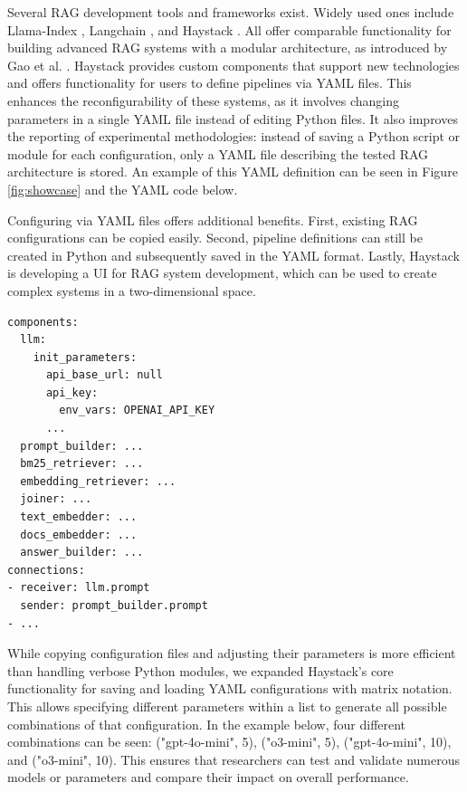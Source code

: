 Several RAG development tools and frameworks exist. Widely used ones include Llama-Index \cite{Liu_LlamaIndex_2022}, Langchain \cite{Chase_LangChain_2022}, and Haystack \cite{Pietsch_Haystack_the_end-to-end_2019}. All offer comparable functionality for building advanced RAG systems with a modular architecture, as introduced by Gao et al. \cite{Gao.18.12.2023}. Haystack provides custom components that support new technologies and offers functionality for users to define pipelines via YAML files. This enhances the reconfigurability of these systems, as it involves changing parameters in a single YAML file instead of editing Python files. It also improves the reporting of experimental methodologies: instead of saving a Python script or module for each configuration, only a YAML file describing the tested RAG architecture is stored. An example of this YAML definition can be seen in Figure \ref{fig:showcase} and the YAML code below.

Configuring via YAML files offers additional benefits. First, existing RAG configurations can be copied easily. Second, pipeline definitions can still be created in Python and subsequently saved in the YAML format. Lastly, Haystack is developing a UI \cite{haystack-ui} for RAG system development, which can be used to create complex systems in a two-dimensional space.

\begin{verbatim}
components:
  llm:
    init_parameters:
      api_base_url: null
      api_key:
        env_vars: OPENAI_API_KEY
      ...
  prompt_builder: ...
  bm25_retriever: ...
  embedding_retriever: ...
  joiner: ...
  text_embedder: ...
  docs_embedder: ...
  answer_builder: ...
connections:
- receiver: llm.prompt
  sender: prompt_builder.prompt
- ...
\end{verbatim}

While copying configuration files and adjusting their parameters is more efficient than handling verbose Python modules, we expanded Haystack's core functionality for saving and loading YAML configurations with matrix notation.
This allows specifying different parameters within a list to generate all possible combinations of that configuration. In the example below, four different combinations can be seen: ("gpt-4o-mini", 5), ("o3-mini", 5), ("gpt-4o-mini", 10), and ("o3-mini", 10). This ensures that researchers can test and validate numerous models or parameters and compare their impact on overall performance.

